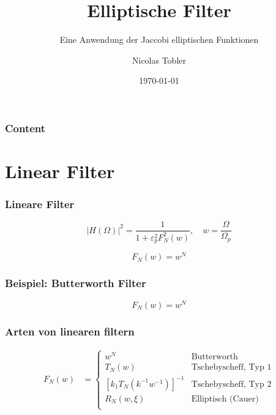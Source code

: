 \documentclass[ngerman, aspectratio=169, xcolor={rgb}]{beamer}
\title{Elliptische Filter}
\subtitle{Eine Anwendung der Jaccobi elliptischen Funktionen}
\author{Nicolas Tobler}
\date{\today}
\begin{document}
	\begin{frame}
		\titlepage
	\end{frame}

	\begin{frame}
		\frametitle{Content}
		\tableofcontents
	\end{frame}

	\section{Linear Filter}

	\begin{frame}
		\frametitle{Lineare Filter}


		\begin{equation}
			| H(\Omega)|^2 = \frac{1}{1 + \varepsilon_p^2 F_N^2(w)}, \quad w=\frac{\Omega}{\Omega_p}
		\end{equation}

		\pause

		\begin{equation}
			F_N(w) = w^N
		\end{equation}

	\end{frame}

	\begin{frame}
		\frametitle{Beispiel: Butterworth Filter}

		\begin{equation}
			F_N(w) = w^N
		\end{equation}

		\begin{center}
			
		\end{center}

	\end{frame}


	\begin{frame}
		\frametitle{Arten von linearen filtern}

		\begin{align*}
			F_N(w) & =
			\begin{cases}
				w^N                            & \text{Butterworth} \\
				T_N(w)                         & \text{Tschebyscheff, Typ 1}  \\
				[k_1 T_N (k^{-1} w^{-1})]^{-1} & \text{Tschebyscheff, Typ 2}  \\
				R_N(w,\xi)                      & \text{Elliptisch (Cauer)}    \\
			\end{cases}
		\end{align*}

	\end{frame}
\end{document}

